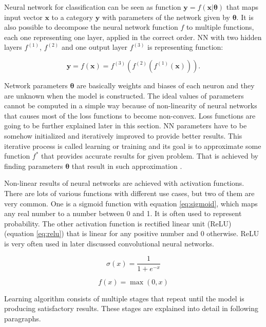 Neural network for classification can be seen as function $\pmb y=f(\pmb x | \pmb \theta)$ that maps input vector $\pmb x$ to a category $\pmb y$ with parameters of the network given by $\pmb \theta$. It is also possible to decompose the neural network function $f$ to multiple functions, each one representing one layer, applied in the correct order. NN with two hidden layers $f^{(1)}$, $f^{(2)}$ and one output layer $f^{(3)}$ is representing function:

\begin{equation}
    \label{eq:forward-prop}
    \pmb y = f(\pmb x) = f^{(3)}(f^{(2)}(f^{(1)}(\pmb x))).
\end{equation}

Network parameters $\pmb \theta$ are basically weights and biases of each neuron and they are unknown when the model is constructed. The ideal values of parameters cannot be computed in a simple way because of non-linearity of neural networks that causes most of the loss functions to become non-convex. Loss functions are going to be further explained later in this section. NN parameters have to be somehow initialized and iteratively improved to provide better results. This iterative process is called learning or training and its goal is to approximate some function $f^*$ that provides accurate results for given problem. That is achieved by finding parameters $\pmb \theta$ that result in such approximation \cite{Goodfellow-et-al-2016}.

Non-linear results of neural networks are achieved with activation functions. There are lots of various functions with different use cases, but two of them are very common. One is a sigmoid function with equation \ref{eq:sigmoid}, which maps any real number to a number between 0 and 1. It is often used to represent probability. The other activation function is rectified linear unit (ReLU) (equation \ref{eq:relu}) that is linear for any positive number and 0 otherwise. ReLU is very often used in later discussed convolutional neural networks.

\begin{equation}
    \label{eq:sigmoid}
    \sigma (x) = \frac{1}{1 + e^{-x}}
\end{equation}

\begin{equation}
    \label{eq:relu}
    f(x) = \max(0, x)
\end{equation}

Learning algorithm consists of multiple stages that repeat until the model is producing satisfactory results. These stages are explained into detail in following paragraphs.

